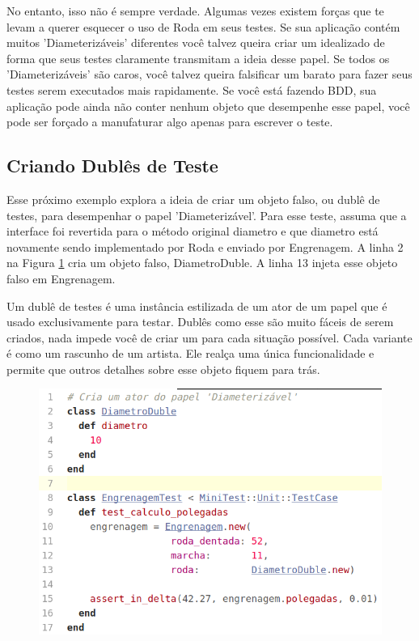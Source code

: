 No entanto, isso não é sempre verdade. Algumas vezes existem forças que te levam
a querer esquecer o uso de Roda em seus testes. Se sua aplicação contém muitos
'Diameterizáveis' diferentes você talvez queira criar um idealizado de forma que
seus testes claramente transmitam a ideia desse papel. Se todos os
'Diameterizáveis' são caros, você talvez queira falsificar um barato para fazer
seus testes serem executados mais rapidamente. Se você está fazendo BDD, sua
aplicação pode ainda não conter nenhum objeto que desempenhe esse papel, você
pode ser forçado a manufaturar algo apenas para escrever o teste.

\subsection{Criando Dublês de Teste}

Esse próximo exemplo explora a ideia de criar um objeto falso, ou dublê de
testes, para desempenhar o papel 'Diameterizável'. Para esse teste, assuma que
a interface foi revertida para o método original diametro e que diametro está
novamente sendo implementado por Roda e enviado por Engrenagem. A linha 2 na
Figura \ref{img:codigo_pag_210} cria um objeto falso, DiametroDuble.
A linha 13 injeta esse objeto falso em Engrenagem.

Um dublê de testes é uma instância estilizada de um ator de um papel
que é usado exclusivamente para testar. Dublês como esse são muito fáceis de
serem criados, nada impede você de criar um para cada situação possível. Cada
variante é como um rascunho de um artista. Ele realça uma única funcionalidade
e permite que outros detalhes sobre esse objeto fiquem para trás.

\begin{figure}[!htbp]
  \center
  \includegraphics[scale=0.50]{imagens/codigo_pag_210.png}
  \label{img:codigo_pag_210}
\end{figure}

